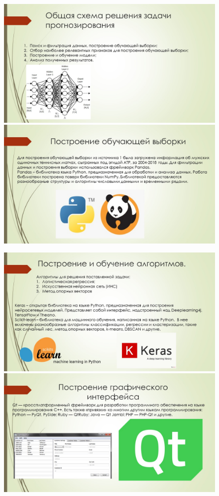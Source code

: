 \begin{figure}[h]
	\includegraphics[scale=0.5]{images/3.JPG}
	\includegraphics[scale=0.5]{images/4.JPG}
\end{figure}
\begin{figure}[h]
	\includegraphics[scale=0.5]{images/5.JPG}
	\includegraphics[scale=0.5]{images/6.JPG}
\end{figure}

